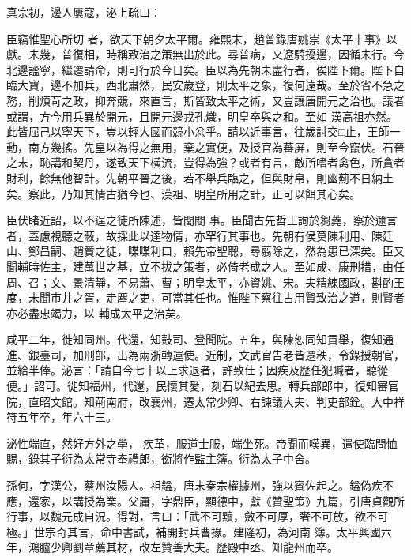 \begin{pinyinscope}
 真宗初，邊人屢寇，泌上疏曰：



 臣竊惟聖心所切
 者，欲天下朝夕太平爾。雍熙末，趙普錄唐姚崇《太平十事》以獻。未幾，普復相，時稱致治之策無出於此。尋普病，又遼騎擾邊，因循未行。今北邊謐寧，繼遷請命，則可行於今日矣。臣以為先朝未盡行者，俟陛下爾。陛下自臨大寶，邊不加兵，西北肅然，民安歲登，則太平之象，復何遠哉。至於省不急之務，削煩苛之政，抑奔競，來直言，斯皆致太平之術，又豈讓唐開元之治也。議者或謂，方今用兵異於開元，且開元邊戎孔熾，明皇卒與之和。至如
 漢高祖亦然。此皆屈己以寧天下，豈以輕大國而競小忿乎。請以近事言，往歲討交□止，王師一動，南方幾搖。先皇以為得之無用，棄之實便，及授官為蕃屏，則至今竄伏。石晉之末，恥講和契丹，遂致天下橫流，豈得為強？或者有言，敵所嗜者禽色，所貪者財利，餘無他智計。先朝平晉之後，若不舉兵臨之，但與財帛，則幽薊不日納土矣。察此，乃知其情古猶今也、漢祖、明皇所用之計，正可以餌其心矣。



 臣伏睹近詔，以不逞之徒所陳述，皆閭閻
 事。臣聞古先哲王詢於芻蕘，察於邇言者，蓋慮視聽之蔽，故採此以達物情，亦罕行其事也。先朝有侯莫陳利用、陳廷山、鄭昌嗣、趙贊之徒，喋喋利口，賴先帝聖聰，尋翦除之，然為患已深矣。臣又聞輔時佐主，建萬世之基，立不拔之策者，必倚老成之人。至如成、康刑措，由任周、召；文、景清靜，不易蕭、曹；明皇太平，亦資姚、宋。夫精練國政，斟酌王度，未聞市井之胥，走塵之吏，可當其任也。惟陛下察往古用賢致治之道，則賢者亦必盡忠竭力，以
 輔成太平之治矣。



 咸平二年，徙知同州。代還，知鼓司、登聞院。五年，與陳恕同知貢舉，復知通進、銀臺司，加刑部，出為兩浙轉運使。近制，文武官告老皆遷秩，令錄授朝官，並給半俸。泌言：「請自今七十以上求退者，許致仕；因疾及歷任犯贓者，聽從便。」詔可。徙知福州，代還，民懷其愛，刻石以紀去思。轉兵部郎中，復知審官院，直昭文館。知荊南府，改襄州，遷太常少卿、右諫議大夫、判吏部銓。大中祥符五年卒，年六十三。



 泌性端直，然好方外之學，
 疾革，服道士服，端坐死。帝聞而嘆異，遣使臨問恤賜，錄其子衍為太常寺奉禮郎，衒將作監主簿。衍為太子中舍。



 孫何，字漢公，蔡州汝陽人。祖鎰，唐末秦宗權據州，強以賓佐起之。鎰偽疾不應，還家，以講授為業。父庸，字鼎臣，顯德中，獻《贊聖策》九篇，引唐貞觀所行事，以魏元成自況。得對，言曰：「武不可黷，斂不可厚，奢不可放，欲不可極。」世宗奇其言，命中書試，補開封兵曹掾。建隆初，為河南
 簿。太平興國六年，鴻臚少卿劉章薦其材，改左贊善大夫。歷殿中丞、知龍州而卒。




\end{pinyinscope}
